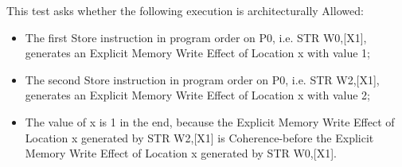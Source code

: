 This test asks whether the following execution is architecturally Allowed:

\begin{itemize}
  \item The first Store instruction in program order on P0, i.e. STR W0,[X1], generates an Explicit Memory Write Effect of Location x with value 1;
  \item The second Store instruction in program order on P0, i.e. STR W2,[X1], generates an Explicit Memory Write Effect of Location x with value 2;
  \item The value of x is 1 in the end, because the Explicit Memory Write Effect of Location x generated by STR W2,[X1] is Coherence-before the Explicit Memory Write Effect of Location x generated by STR W0,[X1].
\end{itemize}
